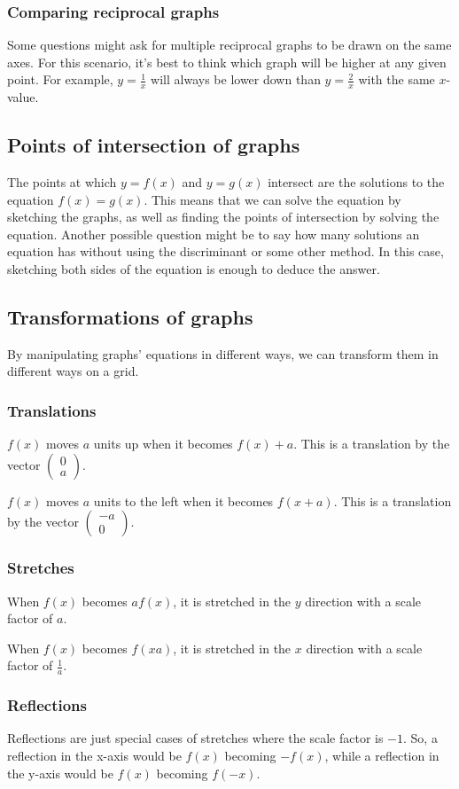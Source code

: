 \subsubsection{Comparing reciprocal graphs}
Some questions might ask for multiple reciprocal graphs to be drawn on the same axes. For this scenario, it's best to think which graph will be higher at any given point. For example, $y=\frac{1}{x}$ will always be lower down than $y=\frac{2}{x}$ with the same $x$-value.

\subsection{Points of intersection of graphs}
The points at which $y=f(x)$ and $y=g(x)$ intersect are the solutions to the equation $f(x)=g(x)$. This means that we can solve the equation by sketching the graphs, as well as finding the points of intersection by solving the equation. Another possible question might be to say how many solutions an equation has without using the discriminant or some other method. In this case, sketching both sides of the equation is enough to deduce the answer.

\subsection{Transformations of graphs}
By manipulating graphs' equations in different ways, we can transform them in different ways on a grid.
\subsubsection{Translations}
$f(x)$ moves $a$ units up when it becomes $f(x)+a$. This is a translation by the vector $\begin{pmatrix}0 \\ a\end{pmatrix}$.

$f(x)$ moves $a$ units to the left when it becomes $f(x+a)$. This is a translation by the vector $\begin{pmatrix}-a \\ 0\end{pmatrix}$.

\subsubsection{Stretches}
When $f(x)$ becomes $af(x)$, it is stretched in the $y$ direction with a scale factor of $a$.

When $f(x)$ becomes $f(xa)$, it is stretched in the $x$ direction with a scale factor of $\frac{1}{a}$.

\subsubsection{Reflections}
Reflections are just special cases of stretches where the scale factor is $-1$. So, a reflection in the x-axis would be $f(x)$ becoming $-f(x)$, while a reflection in the y-axis would be $f(x)$ becoming $f(-x)$.
